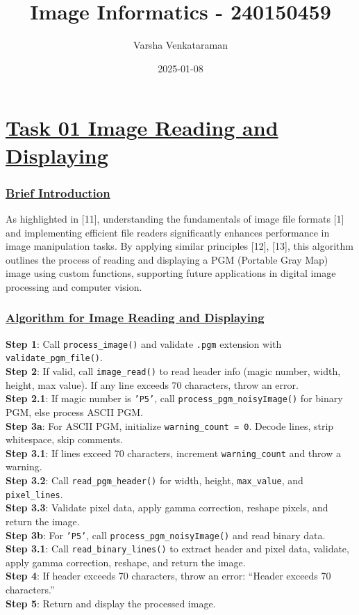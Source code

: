 \documentclass[
  11pt,
]{article}
\title{Image Informatics - 240150459}
\author{Varsha Venkataraman}
\date{2025-01-08}
\begin{document}
\maketitle

\section*{\underline{Task 01 \textendash{} Image Reading and Displaying}}

\subsubsection*{\underline{Brief Introduction}}

As highlighted in {[}11{]}, understanding the fundamentals of image file
formats {[}1{]} and implementing efficient file readers significantly
enhances performance in image manipulation tasks. By applying similar
principles {[}12{]}, {[}13{]}, this algorithm outlines the process of
reading and displaying a PGM (Portable Gray Map) image using custom
functions, supporting future applications in digital image processing
and computer vision.

\subsubsection*{\underline{Algorithm for Image Reading and Displaying}}

\textbf{Step 1}: Call \texttt{process\_image()} and validate
\texttt{.pgm} extension with \texttt{validate\_pgm\_file()}.\\
\textbf{Step 2}: If valid, call \texttt{image\_read()} to read header
info (magic number, width, height, max value). If any line exceeds 70
characters, throw an error.\\
\textbf{Step 2.1}: If magic number is \texttt{'P5'}, call
\texttt{process\_pgm\_noisyImage()} for binary PGM, else process ASCII
PGM.\\
\textbf{Step 3a}: For ASCII PGM, initialize \texttt{warning\_count = 0}.
Decode lines, strip whitespace, skip comments.\\
\textbf{Step 3.1}: If lines exceed 70 characters, increment
\texttt{warning\_count} and throw a warning.\\
\textbf{Step 3.2}: Call \texttt{read\_pgm\_header()} for width, height,
\texttt{max\_value}, and \texttt{pixel\_lines}.\\
\textbf{Step 3.3}: Validate pixel data, apply gamma correction, reshape
pixels, and return the image.\\
\textbf{Step 3b}: For \texttt{'P5'}, call
\texttt{process\_pgm\_noisyImage()} and read binary data.\\
\textbf{Step 3.1}: Call \texttt{read\_binary\_lines()} to extract header
and pixel data, validate, apply gamma correction, reshape, and return
the image.\\
\textbf{Step 4}: If header exceeds 70 characters, throw an error:
``Header exceeds 70 characters.''\\
\textbf{Step 5}: Return and display the processed image.
\end{document}
